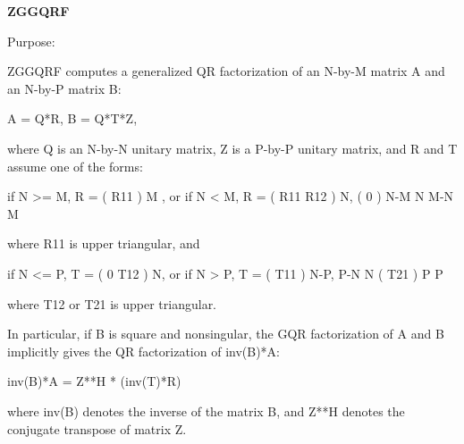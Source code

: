 {\bfseries Z\+G\+G\+Q\+R\+F} 

 \begin{DoxyParagraph}{Purpose\+: }
\begin{DoxyVerb} ZGGQRF computes a generalized QR factorization of an N-by-M matrix A
 and an N-by-P matrix B:

             A = Q*R,        B = Q*T*Z,

 where Q is an N-by-N unitary matrix, Z is a P-by-P unitary matrix,
 and R and T assume one of the forms:

 if N >= M,  R = ( R11 ) M  ,   or if N < M,  R = ( R11  R12 ) N,
                 (  0  ) N-M                         N   M-N
                    M

 where R11 is upper triangular, and

 if N <= P,  T = ( 0  T12 ) N,   or if N > P,  T = ( T11 ) N-P,
                  P-N  N                           ( T21 ) P
                                                      P

 where T12 or T21 is upper triangular.

 In particular, if B is square and nonsingular, the GQR factorization
 of A and B implicitly gives the QR factorization of inv(B)*A:

              inv(B)*A = Z**H * (inv(T)*R)

 where inv(B) denotes the inverse of the matrix B, and Z**H denotes the
 conjugate transpose of matrix Z.\end{DoxyVerb}
 
\end{DoxyParagraph}

